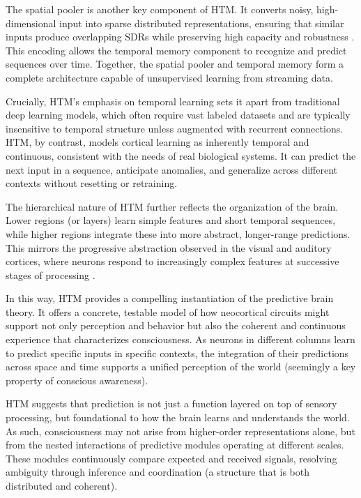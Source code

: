 \documentclass{article}
\begin{document}
The spatial pooler is another key component of HTM. It converts noisy, high-dimensional input into sparse distributed representations, ensuring that similar inputs produce overlapping SDRs while preserving high capacity and robustness \parencite{cui2017spatial}. This encoding allows the temporal memory component to recognize and predict sequences over time. Together, the spatial pooler and temporal memory form a complete architecture capable of unsupervised learning from streaming data.

Crucially, HTM's emphasis on temporal learning sets it apart from traditional deep learning models, which often require vast labeled datasets and are typically insensitive to temporal structure unless augmented with recurrent connections. HTM, by contrast, models cortical learning as inherently temporal and continuous, consistent with the needs of real biological systems. It can predict the next input in a sequence, anticipate anomalies, and generalize across different contexts without resetting or retraining.

The hierarchical nature of HTM further reflects the organization of the brain. Lower regions (or layers) learn simple features and short temporal sequences, while higher regions integrate these into more abstract, longer-range predictions. This mirrors the progressive abstraction observed in the visual and auditory cortices, where neurons respond to increasingly complex features at successive stages of processing \parencite{hawkins2009sequence, clark2016surfing}.

In this way, HTM provides a compelling instantiation of the predictive brain theory. It offers a concrete, testable model of how neocortical circuits might support not only perception and behavior but also the coherent and continuous experience that characterizes consciousness. As neurons in different columns learn to predict specific inputs in specific contexts, the integration of their predictions across space and time supports a unified perception of the world (seemingly a key property of conscious awareness).

HTM suggests that prediction is not just a function layered on top of sensory processing, but foundational to how the brain learns and understands the world. As such, consciousness may not arise from higher-order representations alone, but from the nested interactions of predictive modules operating at different scales. These modules continuously compare expected and received signals, resolving ambiguity through inference and coordination (a structure that is both distributed and coherent).
\end{document}
